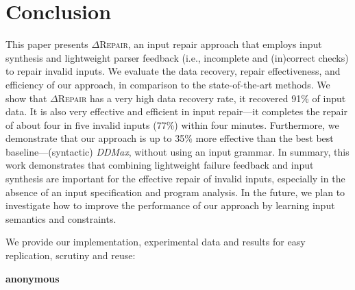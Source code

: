 \documentclass[acmsmall,screen,review,anonymous]{acmart}
\newcommand{\approach}{\textsc{$\Delta$Repair}\xspace}
\newcommand{\ddmax}{\textit{DDMax}\xspace}
\begin{document}
\section{Conclusion}
\label{sec:conclusion}
This paper presents \approach, an input repair approach that employs input synthesis and lightweight parser feedback (i.e., incomplete and (in)correct checks) to repair invalid inputs. 
We evaluate the data recovery, repair effectiveness, and efficiency of our approach, in comparison to the state-of-the-art methods. We show that \approach has a very high data recovery rate, it recovered 91\% of input data. 
It is also very effective and efficient in input repair---it completes the repair of about four in five invalid inputs (77\%) within four minutes. Furthermore, we demonstrate that our approach is up to 35\% more effective than the best 
best baseline---(syntactic) \ddmax, without using an input grammar. In summary, this work demonstrates that combining lightweight failure feedback and input synthesis are important for the effective repair of invalid inputs, especially in the absence of an input specification 
and program analysis.
In the future, we plan to investigate how to improve the performance of our approach by learning input semantics and constraints.

We provide our implementation, experimental data and results for easy replication, scrutiny and reuse:


 \begin{center}
   \textbf{anonymous} %
 \end{center}









\end{document}
